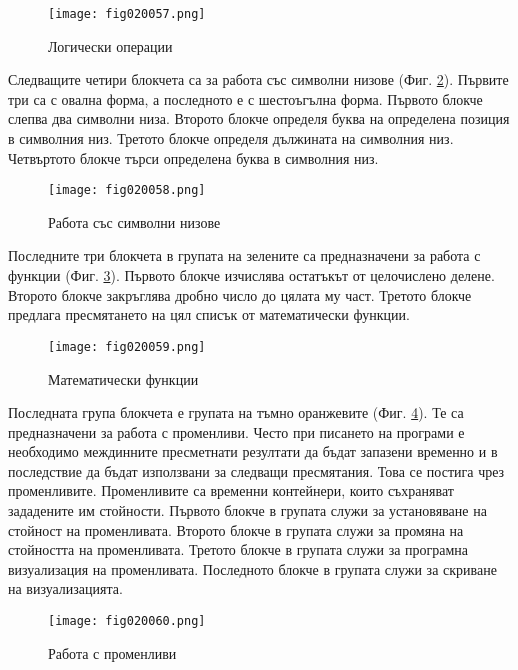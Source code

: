 \begin{figure}[H]
  \centering
  \texttt{[image: fig020057.png]}
  \caption{Логически операции}
\label{fig020057}
\end{figure}

Следващите четири блокчета са за работа със символни низове (Фиг. \ref{fig020058}). Първите три са с овална форма, а последното е с шестоъгълна форма. Първото блокче слепва два символни низа. Второто блокче определя буква на определена позиция в символния низ. Третото блокче определя дължината на символния низ. Четвъртото блокче търси определена буква в символния низ. 

\begin{figure}[H]
  \centering
  \texttt{[image: fig020058.png]}
  \caption{Работа със символни низове}
\label{fig020058}
\end{figure}

Последните три блокчета в групата на зелените са предназначени за работа с функции (Фиг. \ref{fig020059}). Първото блокче изчислява остатъкът от целочислено делене. Второто блокче закръглява дробно число до цялата му част. Третото блокче предлага пресмятането на цял списък от математически функции. 

\begin{figure}[H]
  \centering
  \texttt{[image: fig020059.png]}
  \caption{Математически функции}
\label{fig020059}
\end{figure}

Последната група блокчета е групата на тъмно оранжевите (Фиг. \ref{fig020060}). Те са предназначени за работа с променливи. Често при писането на програми е необходимо междинните пресметнати резултати да бъдат запазени временно и в последствие да бъдат използвани за следващи пресмятания. Това се постига чрез променливите. Променливите са временни контейнери, които съхраняват зададените им стойности. Първото блокче в групата служи за установяване на стойност на променливата. Второто блокче в групата служи за промяна на стойността на променливата. Третото блокче в групата служи за програмна визуализация на променливата. Последното блокче в групата служи за скриване на визуализацията. 

\begin{figure}[H]
  \centering
  \texttt{[image: fig020060.png]}
  \caption{Работа с променливи}
\label{fig020060}
\end{figure}

